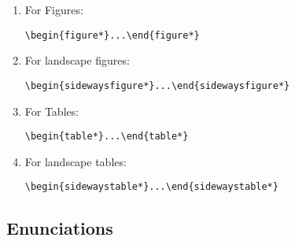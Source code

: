 \documentclass{juliacon}
\begin{document}
\begin{enumerate}
\item For Figures:
\begin{verbatim}
\begin{figure*}...\end{figure*}
\end{verbatim}
\item For landscape figures:
\begin{verbatim}
\begin{sidewaysfigure*}...\end{sidewaysfigure*}
\end{verbatim}
\item For Tables:
\begin{verbatim}
\begin{table*}...\end{table*}
\end{verbatim}
\item For landscape tables:
\begin{verbatim}
\begin{sidewaystable*}...\end{sidewaystable*}
\end{verbatim}
\end{enumerate}

\subsection{Enunciations}
\label{subsub:enunciation}
\end{document}
